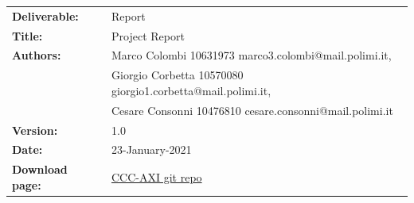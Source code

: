 \begin{table}[h!]
\begin{tabu} to \textwidth { X[0.3,r,p] X[0.7,l,p] }
\hline

\textbf{Deliverable:} & Report\\
\textbf{Title:} & Project Report \\
\textbf{Authors:}
   & Marco Colombi  10631973 marco3.colombi@mail.polimi.it,
\\ & Giorgio Corbetta 10570080 giorgio1.corbetta@mail.polimi.it,
\\ & Cesare Consonni 10476810 cesare.consonni@mail.polimi.it \\
\textbf{Version:} & 1.0 \\
\textbf{Date:} & 23-January-2021 \\
\textbf{Download page:} & \href{https://github.com/CesareConsonni/ES_20-21-CCC}{CCC-AXI git repo} \\
\hline
\end{tabu}
\end{table}




\setcounter{page}{2}




\newpage
{}
\tableofcontents
\newpage

\clearpage
{}
\label{sect:introduction}


\clearpage
{}
\label{sect:design}


\clearpage
{}
\label{sect:uart}


